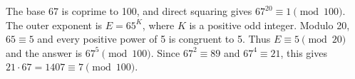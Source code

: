 The base 67 is coprime to 100, and direct squaring gives $67^{20}\equiv1\pmod{100}$. The outer exponent is $E=65^K$, where $K$ is a positive odd integer. Modulo 20, $65\equiv5$ and every positive power of 5 is congruent to 5. Thus $E\equiv5\pmod{20}$ and the answer is $67^5\pmod{100}$. Since $67^2\equiv89$ and $67^4\equiv21$, this gives $21\cdot67=1407\equiv\boxed7\pmod{100}$.
